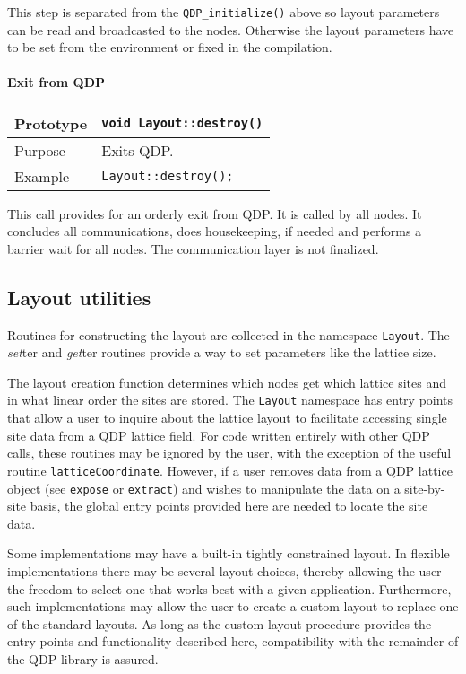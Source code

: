 \documentclass[12pt,letterpaper]{article}
\begin{document}
This step is separated from the \verb|QDP_initialize()| above so
layout parameters can be read and broadcasted to the nodes.  Otherwise
the layout parameters have to be set from the environment or fixed in
the compilation.


\paragraph{Exit from QDP}

\begin{flushleft}
  \begin{tabular}{|l|l|}
  \hline
  Prototype      & \verb|void Layout::destroy()|\\
    \hline
  Purpose        & Exits QDP. \\
\hline
  Example  & \verb|Layout::destroy();| \\
   \hline
 \end{tabular}
\end{flushleft}
%
This call provides for an orderly exit from QDP.  It is called by all
nodes. It concludes all communications, does housekeeping, if needed
and performs a barrier wait for all nodes. The communication layer is
not finalized.

\subsection{Layout utilities}
\label{sec:layout}

Routines for constructing the layout are collected in the namespace
\verb|Layout|. The {\it set}ter and {\it get}ter routines provide
a way to set parameters like the lattice size.

The layout creation function determines which nodes get which lattice
sites and in what linear order the sites are stored. The \verb|Layout|
namespace has entry points that allow a user to inquire about the
lattice layout to facilitate accessing single site data from a QDP
lattice field. For code written entirely with other QDP calls, these
routines may be ignored by the user, with the exception of the useful
routine \verb|latticeCoordinate|.  However, if a user removes data
from a QDP lattice object (see \verb|expose| or \verb|extract|) and
wishes to manipulate the data on a site-by-site basis, the global
entry points provided here are needed to locate the site data.

Some implementations may have a built-in tightly constrained layout.
In flexible implementations there may be several layout choices,
thereby allowing the user the freedom to select one that works best
with a given application.  Furthermore, such implementations may allow
the user to create a custom layout to replace one of the standard
layouts.  As long as the custom layout procedure provides the entry
points and functionality described here, compatibility with the
remainder of the QDP library is assured.
\end{document}
